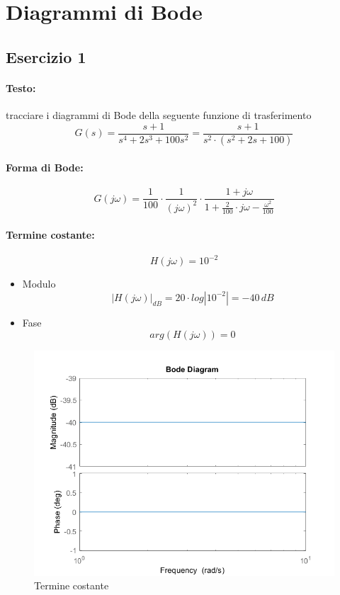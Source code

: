 \documentclass[a4paper,oneside,titlepage]{book}
\begin{document}
\section{Diagrammi di Bode}

\subsection{Esercizio 1}
\paragraph{Testo:}
tracciare i diagrammi di Bode della seguente funzione di trasferimento
\[ G(s) = \frac{s+1}{s^4 + 2s^3 + 100s^2} = \frac{s+1}{s^2 \cdot (s^2 + 2s + 100)} \]

\paragraph{Forma di Bode:}
\[ G(j\omega) = \frac{1}{100} \cdot \frac{1}{(j\omega)^2} \cdot \frac{1+j\omega}{1 + \frac{2}{100} \cdot j\omega - \frac{\omega^2}{100}} \]

\paragraph{Termine costante:}
\[ H(j\omega)= 10^{-2} \]
\begin{itemize}
	\item Modulo
	\[ |H(j\omega)|_{dB} = 20 \cdot log|10^{-2}| = -40 \, dB \]
	\item Fase
	\[ arg(H(j\omega)) = 0 \]
\end{itemize}
\begin{figure}[htp]
	\centering
	\includegraphics[scale=0.5]{costante.png}
	\caption{Termine costante}
	\label{fig:costante}
\end{figure}
\newpage
\end{document}
